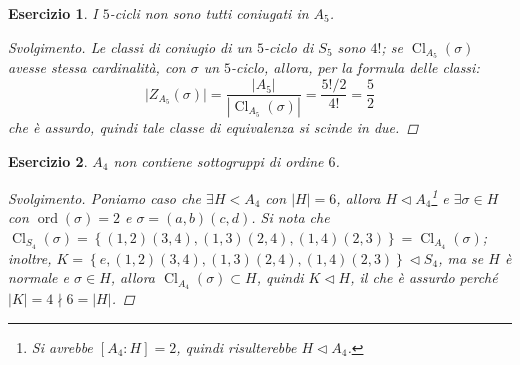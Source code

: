 \documentclass[12pt]{scrartcl}
\theoremstyle{style}
\newtheorem{esercizio}{Esercizio}[section]
\newenvironment{svolgimento}{\renewcommand\qedsymbol{$\blacksquare$}\begin{proof}[Svolgimento]}{\end{proof}}
\numberwithin{equation}{subsection}
\begin{document}
\begin{esercizio}
I $5$-cicli non sono tutti coniugati in $A_5$.
\begin{svolgimento}
	Le classi di coniugio di un $5$-ciclo di $S_5$ sono $4!$; se $\operatorname{Cl} _{A_5} (\sigma )$ avesse stessa cardinalit\`a, con $\sigma $ un $5$-ciclo, allora, per la formula delle classi:
	\[
	\lvert Z_{A_5} (\sigma ) \rvert  = \frac{\lvert A_5 \rvert }{|\operatorname{Cl} _{A_5} (\sigma )|}= \frac{5! /2 }{4!} = \frac{5}{2}
	\] 
	che \`e assurdo, quindi tale classe di equivalenza si scinde in due.
\end{svolgimento}
\end{esercizio}
\begin{esercizio}
$A_4$ non contiene sottogruppi di ordine $6$.
\begin{svolgimento}
	Poniamo caso che $\exists H < A_4$ con $|H| = 6$, allora $H \lhd A_4$\footnote{Si avrebbe $[A_4:H] = 2$, quindi risulterebbe $H\lhd A_4$.} e $\exists \sigma  \in H$ con $\operatorname{ord}(\sigma ) =2$ e $\sigma = (a,b)(c,d)$. 
	Si nota che $\operatorname{Cl}_{S_4} (\sigma ) = \left\{ (1,2)(3,4),(1,3)(2,4),(1,4)(2,3) \right\} = \operatorname{Cl} _{A_4} (\sigma )$; inoltre, $K = \left\{e, (1,2)(3,4),(1,3)(2,4),(1,4)(2,3) \right\}\lhd S_4$, ma se $H$ \`e normale e $\sigma  \in H$, allora $\operatorname{Cl} _{A_4} (\sigma ) \subset H$, quindi $K \lhd H$, il che \`e assurdo perch\'e $\lvert K \rvert =4  \nmid 6 = \lvert H \rvert $.
\end{svolgimento}
\end{esercizio}
\end{document}
